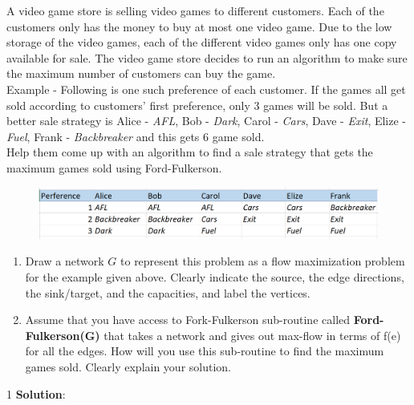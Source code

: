 \documentclass[9pt]{article}
\def\solutions{1}
\begin{document}
A video game store is selling video games to different customers. Each of the customers only has the money to buy at most one video game. Due to the low storage of the video games, each of the different video games only has one copy available for sale. The video game store decides to run an algorithm to make sure the maximum number of customers can buy the game. \\
Example - Following is one such preference of each customer. If the games all get sold according to customers' first preference, only 3 games will be sold. But a better sale strategy is Alice - {\it AFL}, Bob - {\it Dark}, Carol - {\it Cars}, Dave - {\it Exit}, Elize - {\it Fuel}, Frank - {\it Backbreaker} and this gets 6 game sold. \\

Help them come up with an algorithm to find a sale strategy that gets the maximum games sold using Ford-Fulkerson.
\begin{figure}[h!]
\begin{center}
\includegraphics[scale=0.5]{Game.png}
\end{center}
\end{figure}

\begin{enumerate}
    \item Draw a network $G$ to represent this problem as a flow maximization problem for the example given above. Clearly indicate the source, the edge directions, the sink/target, and the capacities, and label the vertices.

    
    \item Assume that you have access to Fork-Fulkerson sub-routine called \textbf{Ford-Fulkerson(G)} that takes a network and gives out max-flow in terms of f(e) for all the edges. How will you use this sub-routine to find the maximum games sold. Clearly explain your solution.

\end{enumerate}

\if\solutions1
\vspace{3mm}
{\bf Solution}: \\
\end{document}
